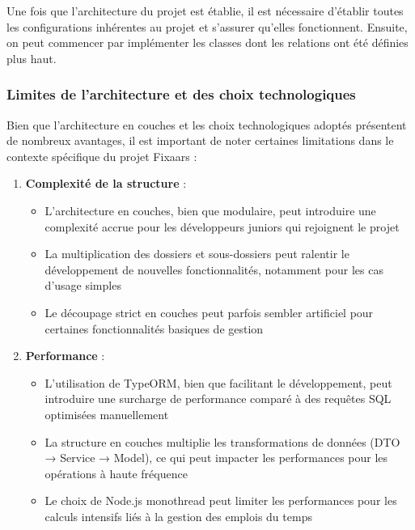 {\begin{enumerate}
Une fois que l'architecture du projet est établie, il est nécessaire d'établir toutes les configurations inhérentes au projet et s'assurer qu'elles fonctionnent. Ensuite, on peut commencer par implémenter les classes dont les relations ont été définies plus haut.

\end{enumerate}

\subsubsection*{Limites de l'architecture et des choix technologiques}
Bien que l'architecture en couches et les choix technologiques adoptés présentent de nombreux avantages, il est important de noter certaines limitations dans le contexte spécifique du projet Fixaars :

\begin{enumerate}
    \item \textbf{Complexité de la structure} : 
    \begin{itemize}
        \item L'architecture en couches, bien que modulaire, peut introduire une complexité accrue pour les développeurs juniors qui rejoignent le projet
        \item La multiplication des dossiers et sous-dossiers peut ralentir le développement de nouvelles fonctionnalités, notamment pour les cas d'usage simples
        \item Le découpage strict en couches peut parfois sembler artificiel pour certaines fonctionnalités basiques de gestion
    \end{itemize}

    \item \textbf{Performance} :
    \begin{itemize}
        \item L'utilisation de TypeORM, bien que facilitant le développement, peut introduire une surcharge de performance comparé à des requêtes SQL optimisées manuellement
        \item La structure en couches multiplie les transformations de données (DTO → Service → Model), ce qui peut impacter les performances pour les opérations à haute fréquence
        \item Le choix de Node.js monothread peut limiter les performances pour les calculs intensifs liés à la gestion des emplois du temps
    \end{itemize}


\end{enumerate}}

